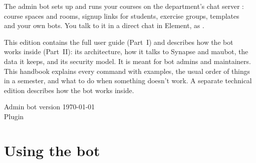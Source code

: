 
\begin{titlepage}
  \thispagestyle{empty}
  \vspace*{7.5cm}

  {\large
    The admin bot sets up and runs your courses on the department's chat server
    \server: course spaces and rooms, signup links for students, exercise groups,
    templates and your own bots. You talk to it in a direct chat in Element, as
    \botid.

    \bigskip
    \iftechnical
    This edition contains the full user guide (Part~I) and describes how the bot works
    inside (Part~II): its architecture, how it talks to Synapse and maubot, the data it
    keeps, and its security model. It is meant for bot admins and maintainers.
    \else
    This handbook explains every command with examples, the usual order of things in a
    semester, and what to do when something doesn't work. A separate technical edition
    describes how the bot works inside.
    \fi\par}

  \vfill
  {\sffamily\color{gray}
  Admin bot version \botversion\hfill \today\\
  Plugin }
\end{titlepage}

\tableofcontents

\iftechnical
\part{Using the bot}
\fi

